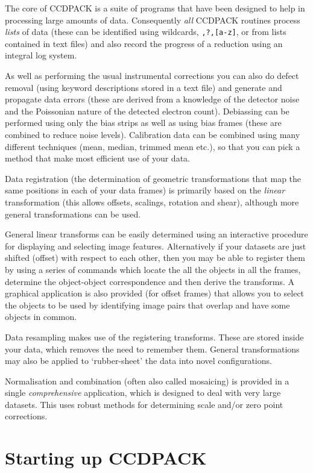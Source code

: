 \documentclass[twoside,11pt]{article}
\newcommand{\xlabel}[1]{}
\renewcommand{\_}{\texttt{\symbol{95}}}
\newcommand{\text}[1]{{\small \tt #1}}
\begin{document}
The core of CCDPACK is a suite of programs that have been designed to
help in processing large amounts of data.  Consequently {\em all}
CCDPACK routines process {\em lists} of data (these can be identified
using wildcards, \text{*,?,[a-z]}, or from lists contained in
text files) and also record the progress of a reduction using an
integral log system.

As well as performing the usual instrumental corrections you can
also do defect removal (using keyword descriptions stored in a text file)
and generate and propagate data errors (these are derived from a knowledge
of the detector noise and the Poissonian nature of the detected
electron count).
Debiassing can be performed using only the bias strips as well as
using bias frames (these are combined to reduce noise levels).
Calibration data can be combined using many different techniques
(mean, median, trimmed mean etc.), so that you can pick a method that
make most efficient use of your data.

Data registration (the determination of geometric transformations that
map the same positions in each of your data frames) is primarily based
on the {\em linear} transformation (this allows offsets, scalings,
rotation and shear), although more general transformations can be
used.

General linear transforms can be easily determined using an
interactive procedure for displaying and selecting image features.
Alternatively if your datasets are just shifted (offset) with respect
to each other, then you may be able to register them by using a series
of commands which locate the all the objects in all the frames,
determine the object-object correspondence and then derive the
transforms.
A graphical application is also provided (for offset frames) that allows
you to select the objects to be used by identifying image pairs that
overlap and have some objects in common.

Data resampling makes use of the registering transforms.
These are stored inside your data, which removes the need to remember them.
General transformations may also be applied to `rubber-sheet' the
data into novel configurations.

Normalisation and combination (often also called mosaicing) is
provided in a single {\em comprehensive} application, which is
designed to deal with very large datasets.
This uses robust methods for determining scale and/or zero point
corrections.

\section{\xlabel{startup}Starting up CCDPACK}
\end{document}
